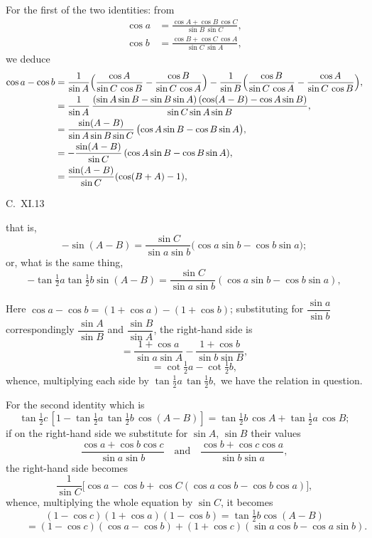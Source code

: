 \documentclass[11pt]{article}
\begin{document}
\noindent
For the first of the two identities: from
\begin{align*}
\cos a &= \frac{\cos A + \cos B\,\cos C}{\sin B\,\sin C},\\
\cos b &= \frac{\cos B + \cos C\,\cos A}{\sin C\,\sin A},
\end{align*}
we deduce
\begin{align*}
\cos a - \cos b &= \frac{1}{\sin A}\Bigl(\frac{\cos A}{\sin C\,\cos B} - \frac{\cos B}{\sin C\,\cos A}\Bigr) - \frac{1}{\sin B}\Bigl(\frac{\cos B}{\sin C\,\cos A} - \frac{\cos A}{\sin C\,\cos B}\Bigr),\\
&= \frac{1}{\sin A}\,\frac{(\sin A\sin B - \sin B\sin A)\,(\cos(A - B) - \cos A\sin B)}{\sin C\sin A\sin B},\\
&= \frac{\sin(A - B)}{\sin A\sin B\sin C}\,\bigl(\cos A\sin B - \cos B\sin A\bigr),\\
&= -\frac{\sin(A - B)}{\sin C}\,(\cos A\sin B - \cos B\sin A),\\
&= \frac{\sin(A - B)}{\sin C}(\cos(B + A) - 1),
\end{align*}

\medskip

C.\ XI.\hfill 13

\newpage

\noindent
that is,
\[
-\sin(A - B) = \frac{\sin C}{\sin a\sin b}\bigl(\cos a\sin b - \cos b\sin a\bigr);
\]
or, what is the same thing,
\[
-\tan\tfrac{1}{2}a\tan\tfrac{1}{2}b\sin(A - B) = \frac{\sin C}{\sin a\sin b}(\cos a\sin b - \cos b\sin a),
\]
\medskip

\noindent
Here $\cos a - \cos b = (1 + \cos a) - (1 + \cos b)$; substituting for $\dfrac{\sin a}{\sin b}$ correspondingly $\dfrac{\sin A}{\sin B}$
and $\dfrac{\sin B}{\sin A}$, the right-hand side is
\[
= \frac{1 + \cos a}{\sin a\sin A} - \frac{1 + \cos b}{\sin b\sin B},
\]
\[
\qquad = \cot\tfrac{1}{2}a - \cot\tfrac{1}{2}b,
\]
whence, multiplying each side by $\tan\tfrac{1}{2}a\,\tan\tfrac{1}{2}b,$ we have the relation in question.

\medskip

\noindent
For the second identity which is
\[
\tan\tfrac{1}{2}c\,[1 - \tan\tfrac{1}{2}a\,\tan\tfrac{1}{2}b\,\cos(A - B)] = \tan\tfrac{1}{2}b\,\cos A + \tan\tfrac{1}{2}a\,\cos B;
\]
if on the right-hand side we substitute for $\sin A,\,\sin B$ their values
\[
\frac{\cos a + \cos b\cos c}{\sin a\sin b}\quad\text{and}\quad\frac{\cos b + \cos c\cos a}{\sin b\sin a},
\]
the right-hand side becomes
\[
\frac{1}{\sin C}\bigl[\cos a - \cos b + \cos C(\cos a\cos b - \cos b\cos a)\bigr],
\]
whence, multiplying the whole equation by $\sin C$, it becomes
\[
(1 - \cos c)(1 + \cos a)(1 - \cos b) = \tan\tfrac{1}{2}b\cos(A - B)
\]
\[
\qquad = (1 - \cos c)(\cos a - \cos b) + (1 + \cos c)(\sin a\cos b - \cos a\sin b).
\]
\end{document}
